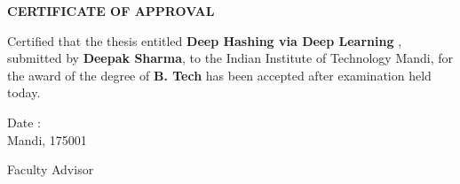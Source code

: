 \thispagestyle{empty}
\setcounter{page}{0}
\vspace*{4cm}
\centerline{\Large \bf CERTIFICATE OF APPROVAL}
\vspace*{2cm}
\noindent Certified that the thesis entitled {\bf Deep Hashing via Deep Learning
}, submitted by {\bf Deepak Sharma}, to the Indian Institute of Technology Mandi, for the award of the degree of {\bf B. Tech} has been accepted after examination held today.\\[3cm]
%
\begin{minipage}{7cm}
	{Date :}\\
	Mandi, 175001 
\end{minipage}
\hfill\begin{minipage}{7cm}
	\centering
	Faculty Advisor 	
\end{minipage}


\clearpage
\thispagestyle{empty}




